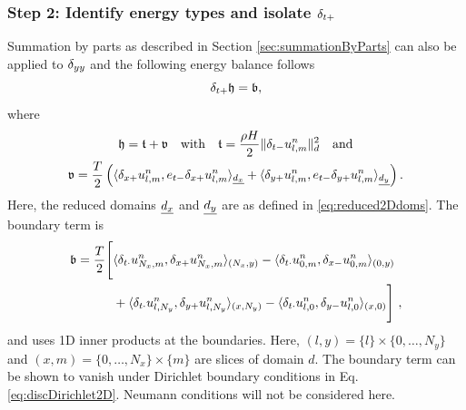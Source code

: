 \subsubsection{Step 2: Identify energy types and isolate $\delta_{t+}$}
Summation by parts as described in Section \ref{sec:summationByParts} can also be applied to $\delta_{yy}$ and the following energy balance follows 
\begin{equation*}
    \delta_{t+} \mathfrak{h} = \mathfrak{b},
\end{equation*}
where 
\begin{equation}\label{eq:energyBalance2DWave}
    \begin{gathered}
        \mathfrak{h} = \mathfrak{t} + \mathfrak{v} \quad \text{with} \quad \mathfrak{t} = \frac{\rho H}{2}\lVert \delta_{t-} u_{l,m}^n\rVert^2_d \quad \text{and}
        \\
        \mathfrak{v} = \frac{T}{2} \left(\langle \delta_{x+} u_{l,m}^n, e_{t-}\delta_{x+} u_{l,m}^n\rangle_{\underline{d_x}} + \langle \delta_{y+} u_{l,m}^n, e_{t-}\delta_{y+} u_{l,m}^n\rangle_{\underline{d_y}} \right).
    \end{gathered}
\end{equation}
Here, the reduced domains $\underline{d_x}$ and $\underline{d_y}$ are as defined in \eqref{eq:reduced2Ddoms}. The boundary term is 
\begin{equation*}
    \begin{aligned}
    \mathfrak{b} =\frac{T}{2}\Bigg[&\langle \delta_{t\cdot} u_{N_x,m}^n, \delta_{x+} u_{N_x,m}^n \rangle_{(N_x, y)} -\langle \delta_{t\cdot} u_{0,m}^n, \delta_{x-} u_{0,m}^n \rangle_{(0, y)}\\
    &+ \langle \delta_{t\cdot} u_{l,N_y}^n, \delta_{y+} u_{l,N_y}^n \rangle_{(x, N_y)} - \langle \delta_{t\cdot} u_{l,0}^n, \delta_{y-} u_{l,0}^n \rangle_{(x, 0)}\Bigg]\ ,
    \end{aligned}
\end{equation*}
and uses 1D inner products at the boundaries. Here, $(l,y) = \{l\}\times\{0, \hdots, N_y\}$ and $(x,m) = \{0, \hdots,  N_x\}\times\{m\}$ are slices of domain $d$. The boundary term can be shown to vanish under Dirichlet boundary conditions in Eq. \eqref{eq:discDirichlet2D}. Neumann conditions will not be considered here.

